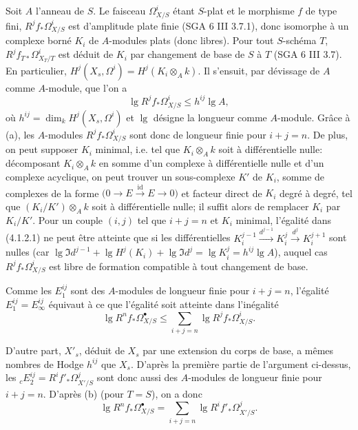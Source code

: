 \documentclass[12pt,a4paper]{article}
\theoremstyle{plain}
\theoremstyle{definition}
\theoremstyle{remark}
\DeclareMathOperator{\id}{id}
\begin{document}
Soit $A$ l'anneau de $S$. Le faisceau $\Omega^i_{X/S}$ \'etant $S$-plat et le morphisme $f$ de type fini, $R^j f_* \Omega^i_{X/S}$ est d'amplitude plate finie (SGA 6 III 3.7.1), donc isomorphe \`a un complexe born\'e $K_i$ de $A$-modules plats (donc libres). Pour tout $S$-sch\'ema $T$, $R^j f_{T*} \Omega^i_{X_T/T}$ est d\'eduit de $K_i$ par changement de base de $S$ \`a $T$ (SGA 6 III 3.7). En particulier, $H^j(X_s, \Omega^i) = H^j(K_i \otimes_A k)$. Il s'ensuit, par d\'evissage de $A$ comme $A$-module, que l'on a
\begin{equation}\label{eq:4.1.2.1}
\lg R^j f_* \Omega^i_{X/S} \le h^{ij} \lg A,
\end{equation}
o\`u $h^{ij} = \dim_k H^j(X_s, \Omega^i)$ et $\lg$ d\'esigne la longueur comme $A$-module. Gr\^ace \`a (a), les $A$-modules $R^j f_* \Omega^i_{X/S}$ sont donc de longueur finie pour $i + j = n$. De plus, on peut supposer $K_i$ minimal, i.e. tel que $K_i \otimes_A k$ soit \`a diff\'erentielle nulle: d\'ecomposant $K_i \otimes_A k$ en somme d'un complexe \`a diff\'erentielle nulle et d'un complexe acyclique, on peut trouver un sous-complexe $K'$ de $K_i$, somme de complexes de la forme $\bigl(0 \to E \xrightarrow{\id} E \to 0\bigr)$ et facteur direct de $K_i$ degr\'e \`a degr\'e, tel que $(K_i/K') \otimes_A k$ soit \`a diff\'erentielle nulle; il suffit alors de remplacer $K_i$ par $K_i/K'$. Pour un couple $(i,j)$ tel que $i + j = n$ et $K_i$ minimal, l'\'egalit\'e dans (4.1.2.1) ne peut \^etre atteinte que si les diff\'erentielles $K_i^{j-1} \xrightarrow{d^{j-1}} K_i^j \xrightarrow{d^j} K_i^{j+1}$ sont nulles (car $\lg \Im d^{j-1} + \lg H^j(K_i) + \lg \Im d^j = \lg K_i^j = h^{ij} \lg A$), auquel cas $R^j f_* \Omega^i_{X/S}$ est libre de formation compatible \`a tout changement de base.

Comme les $E_1^{ij}$ sont des $A$-modules de longueur finie pour $i + j = n$, l'\'egalit\'e $E_1^{ij} = E_\infty^{ij}$ \'equivaut \`a ce que l'\'egalit\'e soit atteinte dans l'in\'egalit\'e
\begin{equation}\label{eq:4.1.2.2}
\lg R^n f_* \Omega^{\bullet}_{X/S} \le \sum_{i+j=n} \lg R^j f_* \Omega^i_{X/S}.
\end{equation}

D'autre part, $X'_s$, d\'eduit de $X_s$ par une extension du corps de base, a m\^emes nombres de Hodge $h^{ij}$ que $X_s$. D'apr\`es la premi\`ere partie de l'argument ci-dessus, les ${}_c E_2^{ij} = R^i f'_* \Omega^j_{X'/S}$ sont donc aussi des $A$-modules de longueur finie pour $i + j = n$. D'apr\`es (b) (pour $T = S$), on a donc
\begin{equation}\label{eq:4.1.2.3}
\lg R^n f_* \Omega^{\bullet}_{X/S} = \sum_{i+j=n} \lg R^i f'_* \Omega^j_{X'/S}.
\end{equation}
\end{document}
